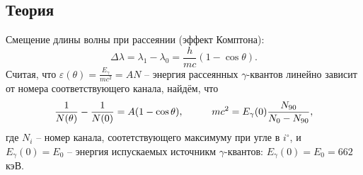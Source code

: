 \subsection*{Теория}


Смещение длины волны при рассеянии (эффект Комптона):
\begin{equation}
    \Delta \lambda = \lambda_1 - \lambda_0 = \frac{h}{mc} \left(1 - \cos \theta\right).
\end{equation}
Считая, что $\varepsilon (\theta) = \frac{E_\gamma}{m c^2}= A N$ -- энергия рассеянных $\gamma$-квантов линейно зависит от номера соответствующего канала, найдём, что
\begin{equation}
    \frac{1}{N(\theta)} - \frac{1}{N(0)} = A (1 - \cos \theta),
    \hspace{10 mm} 
    m c^2 = E_\gamma(0) \frac{N_{90}}{N_0 - N_{90}},
\end{equation}
где $N_i$ -- номер канала, соотетствующего максимуму при угле в $i^{\circ}$, и $E_\gamma (0) = E_0$ -- энергия испускаемых источникм $\gamma$-квантов: $E_\gamma (0) = E_0 = 662$ кэВ.
